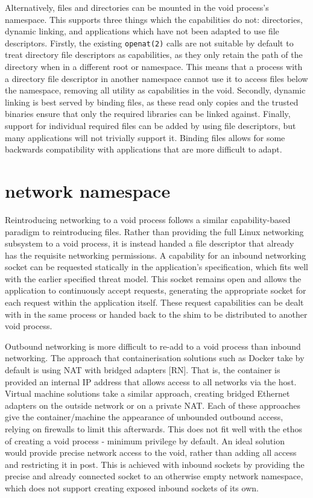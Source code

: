\documentclass[12pt,a4paper,twoside]{report}
\begin{document}
Alternatively, files and directories can be mounted in the void process's namespace. This supports three things which the capabilities do not: directories, dynamic linking, and applications which have not been adapted to use file descriptors. Firstly, the existing \texttt{openat(2)} calls are not suitable by default to treat directory file descriptors as capabilities, as they only retain the path of the directory when in a different root or namespace. This means that a process with a directory file descriptor in another namespace cannot use it to access files below the namespace, removing all utility as capabilities in the void. Secondly, dynamic linking is best served by binding files, as these read only copies and the trusted binaries ensure that only the required libraries can be linked against. Finally, support for individual required files can be added by using file descriptors, but many applications will not trivially support it. Binding files allows for some backwards compatibility with applications that are more difficult to adapt.

\section{network namespace}
\label{sec:filling-net}

Reintroducing networking to a void process follows a similar capability-based paradigm to reintroducing files. Rather than providing the full Linux networking subsystem to a void process, it is instead handed a file descriptor that already has the requisite networking permissions. A capability for an inbound networking socket can be requested statically in the application's specification, which fits well with the earlier specified threat model. This socket remains open and allows the application to continuously accept requests, generating the appropriate socket for each request within the application itself. These request capabilities can be dealt with in the same process or handed back to the shim to be distributed to another void process.

Outbound networking is more difficult to re-add to a void process than inbound networking. The approach that containerisation solutions such as Docker take by default is using NAT with bridged adapters [RN]. That is, the container is provided an internal IP address that allows access to all networks via the host. Virtual machine solutions take a similar approach, creating bridged Ethernet adapters on the outside network or on a private NAT. Each of these approaches give the container/machine the appearance of unbounded outbound access, relying on firewalls to limit this afterwards. This does not fit well with the ethos of creating a void process - minimum privilege by default. An ideal solution would provide precise network access to the void, rather than adding all access and restricting it in post. This is achieved with inbound sockets by providing the precise and already connected socket to an otherwise empty network namespace, which does not support creating exposed inbound sockets of its own.
\end{document}

